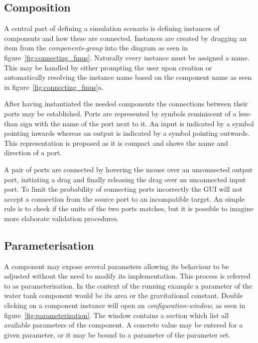 \subsection{Composition}
A central part of defining a simulation scenario is defining instances of components and how these are connected. 
Instances are created by dragging an item from the \emph{components-group} into the diagram as seen in figure~\ref{fig:connecting_fmus}.
Naturally every instance must be assigned a name. This may be handled by either prompting the user upon creation or automatically resolving the instance name based on the component name as seen in figure~\ref{fig:connecting_fmus}a.

After having instantiated the needed components the connections between their ports may be established. 
Ports are represented by symbols reminiscent of a less-than sign with the name of the port next to it.
An input is indicated by a symbol pointing inwards whereas an output is indicated by a symbol pointing outwards.
This representation is proposed as it is compact and shows the name and direction of a port.

A pair of ports are connected by hovering the mouse over an unconnected output port, initiating a drag and finally releasing the drag over an unconnected input port.
To limit the probability of connecting ports incorrectly the GUI will not accept a connection from the source port to an incompatible target.
An simple rule is to check if the units of the two ports matches, but it is possible to imagine more elaborate validation procedures.




\subsection{Parameterisation}
A component may expose several parameters allowing its behaviour to be adjusted without the need to modify its implementation. This process is referred to as parameterisation.
In the context of the running example a parameter of the water tank component would be its area or the gravitational constant. Double clicking on a component instance will open an \emph{configuration-window}, as seen in figure~\ref{fig:parameterization}. The window contains a section which list all available parameters of the component.
A concrete value may be entered for a given parameter, or it may be bound to a parameter of the parameter set.




